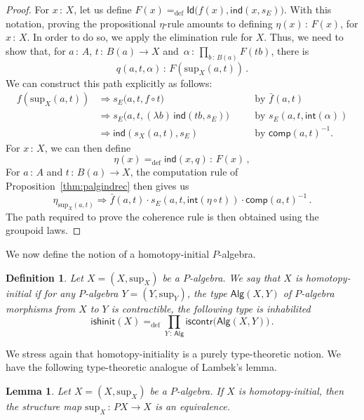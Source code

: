 \documentclass[10pt,a4paper,oneside,reqno]{amsart}
\theoremstyle{mythm}
\newtheorem{lemma}[theorem]{Lemma}
\theoremstyle{mydef}
\newtheorem{definition}[theorem]{Definition}
\theoremstyle{myrmk}
\newcommand{\ie}{\text{i.e.\ }}
\newcommand{\by}[1]{\quad&&\text{by {$#1$}}}
\newcommand{\defeq}{=_{\mathrm{def}}}
\newcommand{\co}{\,{:}\,}
\newcommand{\iscontr}{\mathsf{iscontr}}
\newcommand{\isalghinit}{\mathsf{ishinit}}
\renewcommand{\int}{\mathsf{int}}
\newcommand{\Id}{\mathsf{Id}}
\newcommand{\ind}{\mathsf{ind}}
\newcommand{\comp}{\mathsf{comp}}
\newcommand{\Palg}{\mathsf{Alg}}
\renewcommand{\sup}{\mathrm{sup}}
\begin{document}
\begin{proof} For $x \co X$, let us define $F(x) \defeq \Id \big(   f(x), \ind(x,s_E))$. With this notation, proving
 the propositional $\eta$-rule amounts to defining $\eta(x) \co F(x)$, for $x \co X$. In order to do so, we apply
the elimination rule for $X$. Thus, we need to show that, for $a \co A$, $t \co B(a) \to X$ and~$\alpha \co \prod_{b \co B(a)} F(tb)$, there 
is 
\[
q(a,t,\alpha) \co   F(\sup_X(a,t)) \, .
\]
We can construct this path explicitly as follows:
\begin{align*}
f(\sup_X(a,t)) &\Rightarrow s_E\big(a,t, f \circ t  \big)   \by{\bar{f}(a,t)}\\
	&\Rightarrow s_E\big(a,t, (\lambda b)\, \ind(t b,s_E) \big) \by{s_E(a,t,\int(\alpha))}\\
	& \Rightarrow \ind(s_X(a,t),s_E) \by{\comp(a,t)^{-1}}.
\end{align*}
For $x \co X$, we can then define
\[
\eta(x) \defeq \ind(x,q) \co F(x) \, ,
\] 
For $a \co A$ and $t \co B(a) \to X$, the  computation rule of Proposition~\ref{thm:palgindrec} then gives us
\[
 \eta_{\sup_X(a,t)} \Rightarrow  \bar{f}(a,t) \cdot s_E(a,t,\int(  \eta \circ t ))  \cdot  \comp(a,t)^{-1} \, .
\]
The path required to prove  the coherence rule is then obtained using the groupoid laws.
\end{proof}


\medskip


We now define the notion of a homotopy-initial $P$-algebra.

\begin{definition}\label{def:AlgInit}
Let $X = (X, \sup_X)$ be a $P$-algebra. We say that $X$ is  \emph{homotopy-initial}  if for any $P$-algebra 
$Y = (Y, \sup_Y)$, the type $\Palg(X,Y)$ of $P$-algebra morphisms from $X$ to $Y$
is contractible, \ie the following type is inhabilited
\[
\isalghinit(X) \defeq
 \prod_{Y \co \Palg}  \iscontr \big( \Palg(X,Y) \big)  \, .
\]  
\end{definition}

We stress again that homotopy-initiality is a purely type-theoretic notion. 
We have the following type-theoretic analogue of Lambek's lemma.


\begin{lemma}\label{lem:IntLambek} Let $X = (X, \sup_X)$ be a $P$-algebra. 
If $X$ is homotopy-initial, then the structure map $\sup_X \co PX \to X$ is an equivalence.
\end{lemma}
\end{document}

